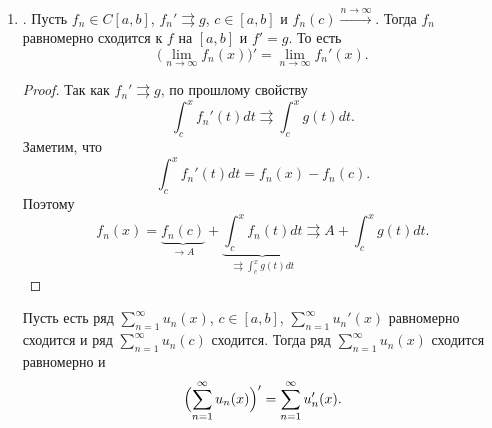 \begin{enumerate}
\item {}.
	Пусть $ f_n \in C[a, b]$, $ f_n' \rightrightarrows g$, $ c \in  [a, b]$ и $ f_n(c) \stackrel{n \to \infty}{\longrightarrow}$. 
	Тогда $ f_n$ равномерно сходится к $ f$ на $ [a, b]$ и $ f' = g$.
	То есть
	\[
		\bigl( \lim_{n \to \infty} f_n(x) \bigr)' = \lim_{n \to \infty} f_n'(x)
	.\] 
	\begin{proof}
		Так как $ f_n ' \rightrightarrows g$, по прошлому свойству 
		\[
			\int_{c}^{x} f_n'(t) dt \rightrightarrows \int_{c}^{x} g(t) dt  
		.\] 
		Заметим, что
		\[
			\int_{c}^{x} f_n'(t) dt  = f_n(x) - f_n(c)
		.\] 
		Поэтому
		\[
			f_n(x) = \underbrace{f_n(c)}_{ \to A} + \underbrace{\int_{c}^{x} f_n(t) dt}_{\rightrightarrows \int_{c}^{x} g(t) dt   } \rightrightarrows A + \int_{c}^{x} g(t) dt 
		.\] 
	\end{proof}
	\begin{cor}
		Пусть есть ряд $ \sum_{n=1}^{\infty} u_n(x)$, $ c \in [a, b]$, $ \sum_{n=1}^{\infty} u_n'(x)$ равномерно сходится и ряд $ \sum_{n=1}^{\infty} u_n(c) $ сходится. Тогда ряд $ \sum_{n=1}^{\infty} u_n(x)$ сходится равномерно и
		\[
			\Bigl(\sum_{n=1}^{\infty} u_n(x)\Bigr)' = \sum_{n=1}^{\infty} u_n'(x)
		.\] 
	\end{cor}

		\fontAwesomeSymbol{\faRandom}

\end{enumerate}

